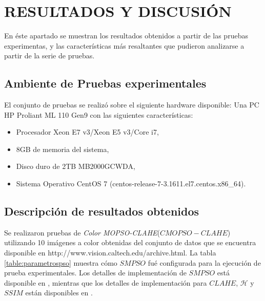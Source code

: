 \chapter{RESULTADOS Y DISCUSIÓN}
\label{sec:results_discussion}

En éste apartado se muestran los resultados obtenidos a partir de las pruebas experimentas, y las características más resaltantes que pudieron analizarse a partir de la serie de pruebas. 
\section{Ambiente de Pruebas experimentales}

El conjunto de pruebas se realizó sobre el siguiente hardware disponible: Una PC HP Proliant ML 110 Gen9 con las siguientes características:

\begin{itemize}
    \item Procesador Xeon E7 v3/Xeon E5 v3/Core i7,
    \item 8GB de memoria del sistema,
    \item Disco duro de 2TB MB2000GCWDA,
    \item Sistema Operativo CentOS 7 (centos-release-7-3.1611.el7.centos.x86\_64).
\end{itemize}


\section{Descripción de resultados obtenidos}

Se realizaron pruebas de \textit{Color MOPSO-CLAHE}($CMOPSO-CLAHE$) utilizando 10 imágenes a color obtenidas del conjunto de datos que se encuentra disponible en http://www.vision.caltech.edu/archive.html. La tabla \ref{table:parametrospso} muestra cómo $SMPSO$ fué configurada para la ejecución de prueba experimentales. Los detalles de implementación de $SMPSO$ está disponible en \cite{durillo2010jmetal}, mientras que los detalles de implementación para $CLAHE$, $\mathscr{H}$ y $SSIM$ están disponibles en \cite{bradski2000opencv}.

